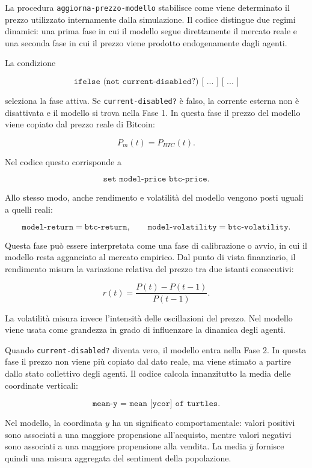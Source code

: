 La procedura \texttt{aggiorna-prezzo-modello} stabilisce come viene determinato
il prezzo utilizzato internamente dalla simulazione. Il codice distingue due
regimi dinamici: una prima fase in cui il modello segue direttamente il mercato
reale e una seconda fase in cui il prezzo viene prodotto endogenamente dagli
agenti.

La condizione

\[
\texttt{ifelse (not current-disabled?) [ ... ] [ ... ]}
\]

seleziona la fase attiva. Se \texttt{current-disabled?} è falso, la corrente
esterna non è disattivata e il modello si trova nella Fase 1. In questa fase il
prezzo del modello viene copiato dal prezzo reale di Bitcoin:

\[
P_m(t)=P_{BTC}(t).
\]

Nel codice questo corrisponde a

\[
\texttt{set model-price btc-price}.
\]

Allo stesso modo, anche rendimento e volatilità del modello vengono posti uguali
a quelli reali:

\[
\texttt{model-return}=\texttt{btc-return},
\qquad
\texttt{model-volatility}=\texttt{btc-volatility}.
\]

Questa fase può essere interpretata come una fase di calibrazione o avvio, in
cui il modello resta agganciato al mercato empirico. Dal punto di vista
finanziario, il rendimento misura la variazione relativa del prezzo tra due
istanti consecutivi:

\[
r(t)=\frac{P(t)-P(t-1)}{P(t-1)}.
\]

La volatilità misura invece l'intensità delle oscillazioni del prezzo. Nel
modello viene usata come grandezza in grado di influenzare la dinamica degli
agenti.

Quando \texttt{current-disabled?} diventa vero, il modello entra nella Fase 2.
In questa fase il prezzo non viene più copiato dal dato reale, ma viene stimato
a partire dallo stato collettivo degli agenti. Il codice calcola innanzitutto la
media delle coordinate verticali:

\[
\texttt{mean-y = mean [ycor] of turtles}.
\]

Nel modello, la coordinata \(y\) ha un significato comportamentale: valori
positivi sono associati a una maggiore propensione all'acquisto, mentre valori
negativi sono associati a una maggiore propensione alla vendita. La media
\(\bar{y}\) fornisce quindi una misura aggregata del sentiment della popolazione.

